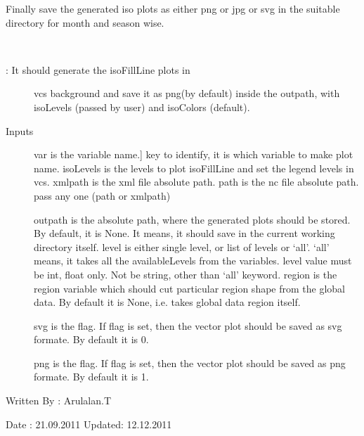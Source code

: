 \documentclass[letterpaper,10pt,english]{sphinxmanual}
\begin{document}
Finally save the generated iso plots as either png or jpg or svg in the suitable directory for month and season wise.
\label{diagnosis:module-generate_iso_plots}

\begin{fulllineitems}
\label{diagnosis:generate_iso_plots.genIsoFillLinePlots}~\begin{description}
\item[{{\hyperref[diagnosis:generate_iso_plots.genIsoFillLinePlots]{}}: It should generate the isoFillLine plots in}] \leavevmode
vcs background and save it as png(by default) inside the outpath,
with isoLevels (passed by user) and isoColors (default).

\item[{Inputs}] \leavevmode{[}var is the variable name.{]}
key to identify, it is which variable to make plot name.
isoLevels is the levels to plot isoFillLine and set the legend
levels in vcs.
xmlpath is the xml file absolute path.
path is the nc file absolute path.
pass any one (path or xmlpath)

outpath is the absolute path, where the generated plots should be
stored. By default, it is None. It means, it should save in the
current working directory itself.
level is either single level, or list of levels or `all'.
`all' means, it takes all the availableLevels from the variables.
level value must be int, float only. Not be string, other than
`all' keyword.
region is the region variable which should cut particular region
shape from the global data. By default it is None, i.e. takes
global data region itself.

svg is the flag. If flag is set, then the vector plot should be
saved as svg formate. By default it is 0.

png is the flag. If flag is set, then the vector plot should be
saved as png formate. By default it is 1.

\end{description}

Written By : Arulalan.T

Date : 21.09.2011
Updated: 12.12.2011

\end{fulllineitems}
\end{document}
